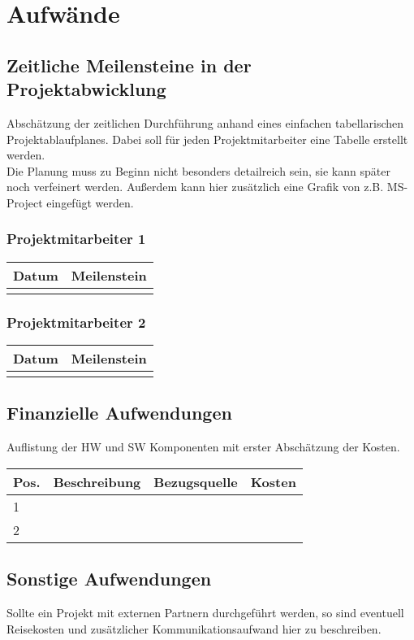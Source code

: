 \documentclass[12pt]{article}
\begin{document}
\section{Aufwände}
\subsection{Zeitliche Meilensteine in der Projektabwicklung}
Abschätzung der zeitlichen Durchführung anhand eines einfachen tabellarischen Projektablaufplanes.
Dabei soll für jeden Projektmitarbeiter eine Tabelle erstellt werden. \\
Die Planung muss zu Beginn nicht besonders detailreich sein, sie kann später noch verfeinert werden.
Außerdem kann hier zusätzlich eine Grafik von z.B. MS-Project eingefügt werden.

\subsubsection{Projektmitarbeiter 1}
\begin{tabularx}{\textwidth}{| l | X |}
    \hline
    \textbf{Datum} & \textbf{Meilenstein} \\
    \hline
     & \\
    \hline
\end{tabularx}

\subsubsection{Projektmitarbeiter 2}
\begin{tabularx}{\textwidth}{| l | X |}
    \hline
    \textbf{Datum} & \textbf{Meilenstein} \\
    \hline
     & \\
    \hline
\end{tabularx}

\subsection{Finanzielle Aufwendungen}
Auflistung der HW und SW Komponenten mit erster Abschätzung der Kosten. \\
\begin{tabularx}{\textwidth}{| p{} | p{} | p{} | X |}
    \hline
    \textbf{Pos.} & \textbf{Beschreibung} & \textbf{Bezugsquelle} & \textbf{Kosten}\\
    \hline
    1 & & & \\
    \hline
    2 & & & \\
    \hline
\end{tabularx}

\subsection{Sonstige Aufwendungen}
Sollte ein Projekt mit externen Partnern durchgeführt werden, so sind eventuell Reisekosten und zusätzlicher Kommunikationsaufwand hier zu beschreiben.

\clearpage
\listoffigures
\end{document}

